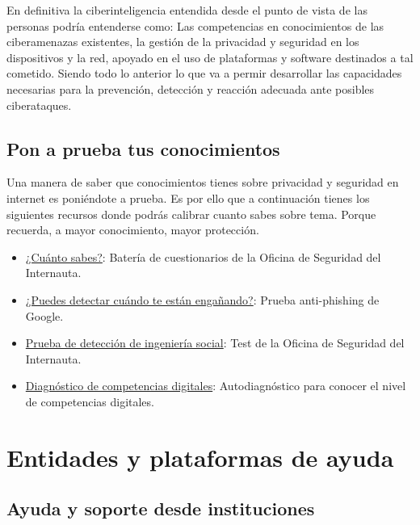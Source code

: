 \documentclass[
  spanish,
  a4paper,
  openany]{book}
\begin{document}
En definitiva la ciberinteligencia entendida desde el punto de vista de las personas podría entenderse como: Las competencias en conocimientos de las ciberamenazas existentes, la gestión de la privacidad y seguridad en los dispositivos y la red, apoyado en el uso de plataformas y software destinados a tal cometido. Siendo todo lo anterior lo que va a permir desarrollar las capacidades necesarias para la prevención, detección y reacción adecuada ante posibles ciberataques.

\hypertarget{pon-a-prueba-tus-conocimientos}{%
\section{Pon a prueba tus conocimientos}\label{pon-a-prueba-tus-conocimientos}}

Una manera de saber que conocimientos tienes sobre privacidad y seguridad en internet es poniéndote a prueba. Es por ello que a continuación tienes los siguientes recursos donde podrás calibrar cuanto sabes sobre tema. Porque recuerda, a mayor conocimiento, mayor protección.

\begin{itemize}
\item
  \href{https://www.osi.es/es/cuanto-sabes}{¿Cuánto sabes?}: Batería de cuestionarios de la Oficina de Seguridad del Internauta.
\item
  \href{https://phishingquiz.withgoogle.com/?hl=es}{¿Puedes detectar cuándo te están engañando?}: Prueba anti-phishing de Google.
\item
  \href{https://www.osi.es/es/campanas/ingenieria-social/prueba-deteccion-ingenieria-social\#collapsesuscripcion_index}{Prueba de detección de ingeniería social}: Test de la Oficina de Seguridad del Internauta.
\item
  \href{https://www.digcomp.andaluciaesdigital.es/}{Diagnóstico de competencias digitales}: Autodiagnóstico para conocer el nivel de competencias digitales.
\end{itemize}

\hypertarget{entidades-y-plataformas-de-ayuda}{%
\chapter{Entidades y plataformas de ayuda}\label{entidades-y-plataformas-de-ayuda}}

\hypertarget{ayuda-y-soporte-desde-instituciones}{%
\section{Ayuda y soporte desde instituciones}\label{ayuda-y-soporte-desde-instituciones}}
\end{document}
